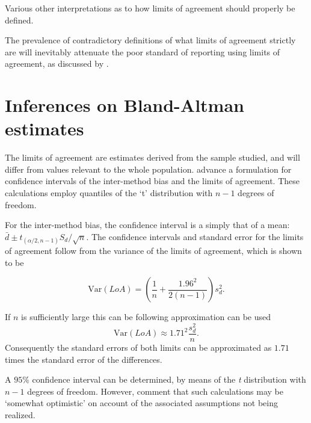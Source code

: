 \documentclass[12pt, a4paper]{report}
\theoremstyle{plain}
\theoremstyle{definition}
\theoremstyle{remark}
\begin{document}
Various other interpretations as to how limits of agreement should properly be defined. 

The prevalence of contradictory definitions of what limits of agreement strictly are will inevitably attenuate the poor standard of reporting using limits of agreement, as discussed by \citet{mantha}.


\section{Inferences on Bland-Altman estimates}
	The limits of agreement are estimates derived from the sample
	studied, and will differ from values relevant to the whole
	population. \citet*{BA86} advance a formulation for confidence
	intervals of the inter-method bias and the limits of agreement.
	These calculations employ quantiles of the `t' distribution with
	$n -1$ degrees of freedom.
	
	For the inter-method bias, the confidence interval is a simply that of a mean: $\bar{d} \pm t_{(\alpha/2,n-1)} S_{d}/\sqrt{n}$.
	The confidence
	intervals and standard error for the limits of agreement follow from the variance of the limits of agreement, which is shown to be
	
	\[
	\mbox{Var}(LoA) = (\frac{1}{n}+\frac{1.96^{2}}{2(n-1)})s_{d}^{2}.
	\]
	
	If $n$ is sufficiently large this can be following approximation can be used
	\[
	\mbox{Var}(LoA) \approx 1.71^{2}\frac{s_{d}^{2}}{n}.
	\]
	Consequently the standard errors of both limits can be approximated as $1.71$ times the standard error of the differences.
	
	A $95\%$ confidence interval can be determined, by means of the \emph{t} distribution with $n-1$ degrees of freedom. However, \citet*{BA99} comment that such calculations  may be `somewhat optimistic' on account of the associated assumptions not being realized.
	
\end{document}
